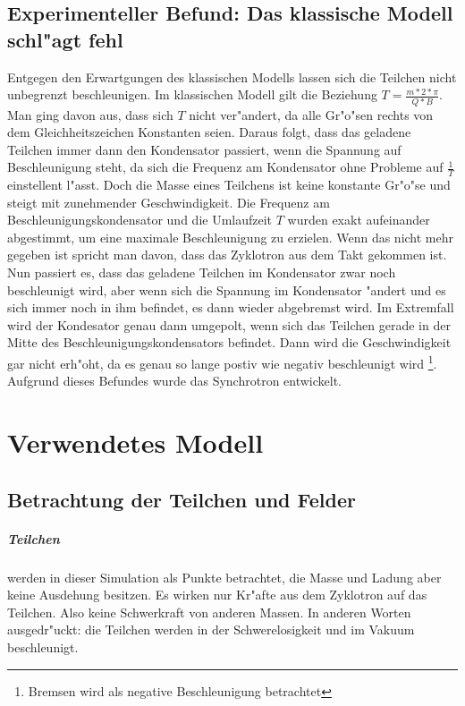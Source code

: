 \documentclass[14pt, a4paper]{report}
\begin{document}
\section{Experimenteller Befund: Das klassische Modell schl"agt fehl}
Entgegen den Erwartgungen des klassischen Modells
lassen sich die Teilchen nicht unbegrenzt beschleunigen. Im klassischen Modell
gilt die Beziehung $T = \frac{m * 2 * \pi }{Q * B}$.
Man ging davon aus, dass sich $T$ nicht ver"andert, da alle Gr"o"sen rechts von dem 
Gleichheitszeichen Konstanten seien. Daraus folgt, dass das geladene Teilchen immer dann den Kondensator passiert,
wenn die Spannung auf Beschleunigung steht, da sich die Frequenz am Kondensator ohne
Probleme auf $\frac{1}{T}$ einstellent l"asst. Doch die Masse eines Teilchens
ist keine konstante Gr"o"se  und steigt mit zunehmender 
Geschwindigkeit. Die Frequenz am Beschleunigungskondensator und die Umlaufzeit $T$ 
wurden
exakt aufeinander abgestimmt, um eine maximale Beschleunigung zu erzielen. Wenn das 
nicht mehr gegeben ist spricht man davon, dass das Zyklotron aus dem Takt gekommen ist.
\label{Zyklotron aus dem Takt}
Nun passiert es,
dass das geladene Teilchen im Kondensator zwar noch beschleunigt wird, aber wenn sich die
Spannung im Kondensator "andert und es sich immer noch in ihm befindet, es dann wieder 
abgebremst wird. Im Extremfall wird der Kondesator genau dann umgepolt, wenn sich das 
Teilchen gerade in der Mitte des Beschleunigungskondensators befindet. Dann wird die 
Geschwindigkeit gar nicht erh"oht, da es genau so lange postiv wie negativ beschleunigt 
wird \footnote{Bremsen wird als negative Beschleunigung betrachtet}.
Aufgrund dieses Befundes wurde das Synchrotron entwickelt.

\chapter{Verwendetes Modell}
\section{Betrachtung der Teilchen und Felder}
\paragraph{Teilchen} 
werden in dieser Simulation als Punkte betrachtet, die Masse und Ladung aber keine 
Ausdehung besitzen. Es wirken nur Kr"afte aus dem Zyklotron auf das Teilchen. Also keine
Schwerkraft von anderen Massen. In anderen Worten ausgedr"uckt: 
die Teilchen werden in der Schwerelosigkeit und im Vakuum beschleunigt.
\end{document}
